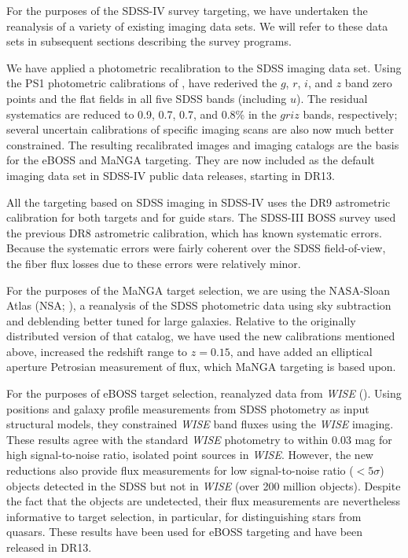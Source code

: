 For the purposes of the SDSS-IV survey targeting, we have undertaken
the reanalysis of a variety of existing imaging data sets.  We will refer
to these data sets in subsequent sections describing the survey
programs.

We have applied a photometric recalibration to the SDSS imaging data
set. Using the PS1 photometric calibrations
of \citet{schlafly12a}, \citet{finkbeiner16a} have rederived the $g$,
$r$, $i$, and $z$ band zero points and the flat fields in all five SDSS
bands (including $u$).  The residual systematics are reduced to 0.9,
0.7, 0.7, and 0.8\% in the $griz$ bands, respectively; several
uncertain calibrations of specific imaging scans are also now much
better constrained. The resulting recalibrated images and imaging
catalogs are the basis for the eBOSS and MaNGA targeting.  They are
now included as the default imaging data set in SDSS-IV public data
releases, starting in DR13. 

All the targeting based on SDSS imaging in SDSS-IV uses the DR9
astrometric calibration \citep{pier03a,ahn12a} for both targets and
for guide stars. The SDSS-III BOSS survey used the previous DR8
astrometric calibration, which has known systematic errors. Because
the systematic errors were fairly coherent over the SDSS
field-of-view, the fiber flux losses due to these errors were
relatively minor.

For the purposes of the MaNGA target selection, we are using the
NASA-Sloan Atlas (NSA; \citealt{blanton11a}), a reanalysis of the SDSS
photometric data using sky subtraction and deblending better tuned for
large galaxies. Relative to the originally distributed version of that
catalog, we have used the new calibrations mentioned above, increased
the redshift range to $z=0.15$, and have added an elliptical aperture
Petrosian measurement of flux, which MaNGA targeting is based upon.

For the purposes of eBOSS target selection, \citet{lang16a} reanalyzed
data from {\it WISE} (\citealt{wright10a}). Using positions and galaxy
profile measurements from SDSS photometry as input structural models,
they constrained {\it WISE} band fluxes using the {\it WISE}
imaging. These results agree with the standard {\it WISE} photometry
to within 0.03 mag for high signal-to-noise ratio, isolated point
sources in {\it WISE}.  However, the new reductions also provide flux
measurements for low signal-to-noise ratio ($<5\sigma$) objects
detected in the SDSS but not in {\it WISE} (over 200 million
objects). Despite the fact that the objects are undetected, their flux
measurements are nevertheless informative to target selection, in
particular, for distinguishing stars from quasars.  These results have
been used for eBOSS targeting and have been released in DR13.

